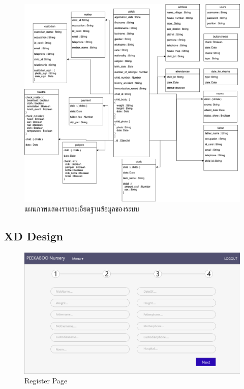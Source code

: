 %
  \begin{landscape}
    \begin{figure}
      \begin{center}
      \includegraphics[height=0.9\textheight]{images/databaseDiagram.png}
      \end{center}
    \caption{แผนภาพแสดงรายละเอียดฐานข้อมูลของระบบ}
    \label{fig:DatabaseDiagram}
  \end{figure}
\end{landscape}

\subsection{XD Design}

\begin{figure}
  \begin{center}
  \includegraphics[width=\linewidth]{images/registerPage.png}
  \end{center}
  \caption[Poem]{Register Page}
  \label{fig:register}
  \end{figure}


